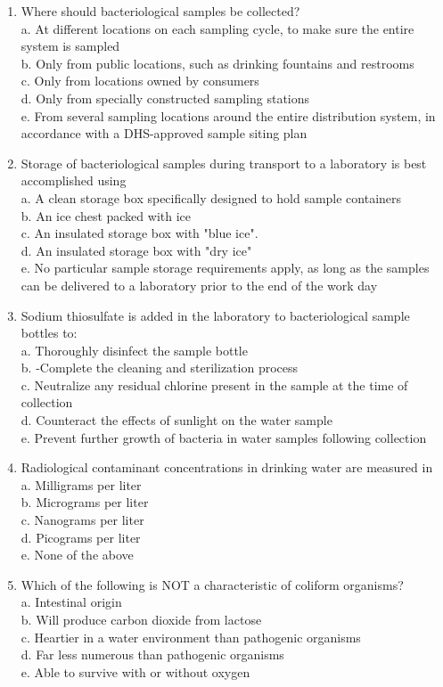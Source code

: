 \documentclass{article}
\begin{document}
\begin{enumerate}[1.]
\item Where should bacteriological samples be collected?\\
a. At different locations on each sampling cycle, to make sure the entire system is sampled\\
b. Only from public locations, such as drinking fountains and restrooms\\
c. Only from locations owned by consumers\\
d. Only from specially constructed sampling stations\\
e. From several sampling locations around the entire distribution system, in accordance with a DHS-approved sample siting plan\\
\item Storage of bacteriological samples during transport to a laboratory is best accomplished using\\
a. A clean storage box specifically designed to hold sample containers\\
b. An ice chest packed with ice\\
c. An insulated storage box with "blue ice".\\
d. An insulated storage box with "dry ice"\\
e. No particular sample storage requirements apply, as long as the samples can be delivered to a laboratory prior to the end of the work day\\
  \item Sodium thiosulfate is added in the laboratory to bacteriological sample bottles to:\\
a. Thoroughly disinfect the sample bottle\\
b. -Complete the cleaning and sterilization process\\
c. Neutralize any residual chlorine present in the sample at the time of collection\\
d. Counteract the effects of sunlight on the water sample\\
e. Prevent further growth of bacteria in water samples following collection\\
  \item Radiological contaminant concentrations in drinking water are measured in\\
a. Milligrams per liter\\
b. Micrograms per liter\\
c. Nanograms per liter\\
d. Picograms per liter\\
e. None of the above\\
  \item Which of the following is NOT a characteristic of coliform organisms?\\
a. Intestinal origin\\
b. Will produce carbon dioxide from lactose\\
c. Heartier in a water environment than pathogenic organisms\\
d. Far less numerous than pathogenic organisms\\
e. Able to survive with or without oxygen\\


\end{enumerate}
\end{document}
